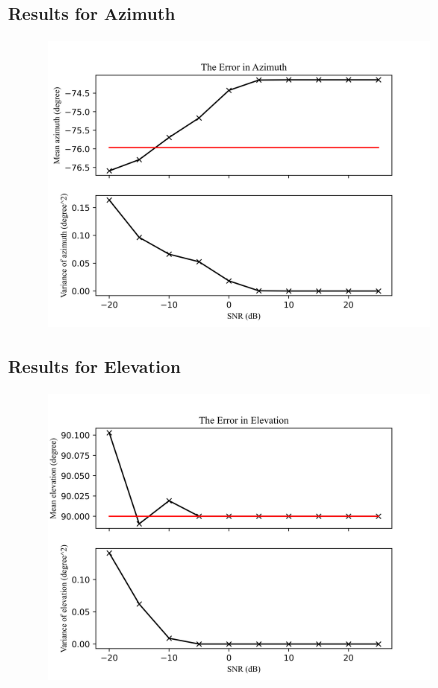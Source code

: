 \documentclass{beamer}
\begin{document}
\begin{frame}
\frametitle{Results for Azimuth}

\begin{figure}[H]
\includegraphics[width=0.9\textwidth]{../Python/srp_phat/noise_azimuth.png}
\centering
\end{figure}

\end{frame}

\begin{frame}
\frametitle{Results for Elevation}

\begin{figure}[H]
\includegraphics[width=0.9\textwidth]{../Python/srp_phat/noise_elevation.png}
\centering
\end{figure}

\end{frame}
\end{document}
